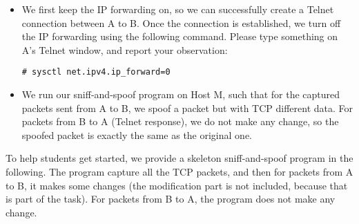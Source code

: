 \begin{itemize}

\item We first keep the IP forwarding on, so we can successfully create a Telnet connection
between A to B. Once the connection is established, we turn off the IP forwarding using the
following command. Please type something on A's Telnet window, and report your observation: 

\begin{lstlisting}
# sysctl net.ipv4.ip_forward=0
\end{lstlisting}

\item We run our sniff-and-spoof program on Host M, such that for the captured packets sent
from A to B,  we spoof a packet but with TCP different data. For packets from B to A (Telnet
response), we do not make any change, so the spoofed packet is exactly the same as the original
one. 
\end{itemize} 

To help students get started, we provide a skeleton sniff-and-spoof
program in the following. The program capture all the TCP packets, and 
then for packets from A to B, it makes some changes (the modification
part is not included, because that is part of the task). For packets from
B to A, the program does not make any change.  

